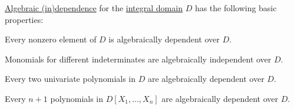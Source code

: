 \begin{proposition}\label{thm:def:algebraic_dependence}
  \hyperref[def:algebraic_dependence]{Algebraic (in)dependence} for the \hyperref[def:integral_domain]{integral domain} \( D \) has the following basic properties:
  \begin{thmenum}
     Every nonzero element of \( D \) is algebraically dependent over \( D \).

     Monomials for different indeterminates are algebraically independent over \( D \).

     Every two univariate polynomials in \( D \) are algebraically dependent over \( D \).

     Every \( n + 1 \) polynomials in \( D[X_1, \ldots, X_n] \) are algebraically dependent over \( D \).
  \end{thmenum}
\end{proposition}
